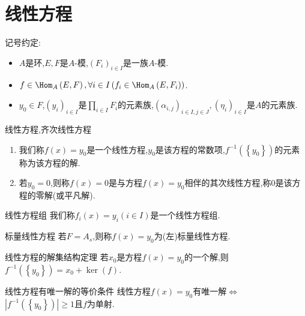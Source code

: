 \section{线性方程}

记号约定:

\begin{itemize}
	\item $A$是环,$E,F$是$A$-模,$\left(F_{i}\right)_{i\in I}$是一族$A$-模.
	\item $f\in\Hom_{A}\left(E,F\right),\forall i\in I\left(f_{i}\in\Hom_{A}\left(E,F_{i}\right)\right)$.
	\item $y_{0}\in F$,$\left(y_{i}\right)_{i\in I}$是$\prod\limits_{i\in I}F_{i}$的元素族,$\left(\alpha_{i,j}\right)_{i\in I,j\in J},\left(\eta_{i}\right)_{i\in I}$是$A$的元素族.
\end{itemize}

\begin{definition}{线性方程,齐次线性方程}{}
	\begin{enumerate}
		\item 我们称$f\left(x\right)=y_{0}$是一个线性方程,$y_{0}$是该方程的常数项,$f^{-1}\left(\left\{y_{0}\right\}\right)$的元素称为该方程的解.
		\item 若$y_{0}=0$,则称$f\left(x\right)=0$是与方程$f\left(x\right)=y_{0}$相伴的其次线性方程,称$0$是该方程的零解(或平凡解).
	\end{enumerate}
\end{definition}

\begin{definition}{线性方程组}{}
	我们称$f_{i}\left(x\right)=y_{i}\left(i\in I\right)$是一个线性方程组.
\end{definition}

\begin{definition}{标量线性方程}{}
	若$F=A_{s}$,则称$f\left(x\right)=y_{0}$为(左)标量线性方程.
\end{definition}

\begin{proposition}{线性方程的解集结构定理}{}
	若$x_{0}$是方程$f\left(x\right)=y_{0}$的一个解,则$f^{-1}\left(\left\{y_{0}\right\}\right)=x_{0}+\ker\left(f\right)$.
\end{proposition}

\begin{corollary}{线性方程有唯一解的等价条件}{}
	线性方程$f\left(x\right)=y_{0}$有唯一解$\iff$ $\left|f^{-1}\left(\left\{y_{0}\right\}\right)\right|\geqslant 1$且$f$为单射.
\end{corollary}

